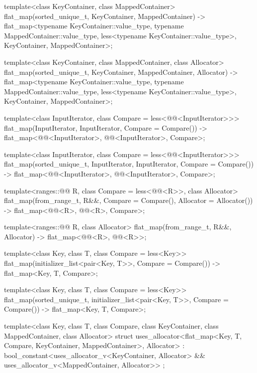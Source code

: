 \begin{codeblock}
{  template<class KeyContainer, class MappedContainer>
    flat_map(sorted_unique_t, KeyContainer, MappedContainer)
      -> flat_map<typename KeyContainer::value_type, typename MappedContainer::value_type,
                  less<typename KeyContainer::value_type>, KeyContainer, MappedContainer>;

  template<class KeyContainer, class MappedContainer, class Allocator>
    flat_map(sorted_unique_t, KeyContainer, MappedContainer, Allocator)
      -> flat_map<typename KeyContainer::value_type, typename MappedContainer::value_type,
                  less<typename KeyContainer::value_type>, KeyContainer, MappedContainer>;

  template<class InputIterator, class Compare = less<@@<InputIterator>>>
    flat_map(InputIterator, InputIterator, Compare = Compare())
      -> flat_map<@@<InputIterator>, @@<InputIterator>, Compare>;

  template<class InputIterator, class Compare = less<@@<InputIterator>>>
    flat_map(sorted_unique_t, InputIterator, InputIterator, Compare = Compare())
      -> flat_map<@@<InputIterator>, @@<InputIterator>, Compare>;

  template<ranges::@@ R, class Compare = less<@@<R>>,
           class Allocator>
    flat_map(from_range_t, R&&, Compare = Compare(), Allocator = Allocator())
      -> flat_map<@@<R>, @@<R>, Compare>;

  template<ranges::@@ R, class Allocator>
    flat_map(from_range_t, R&&, Allocator)
      -> flat_map<@@<R>, @@<R>>;

  template<class Key, class T, class Compare = less<Key>>
    flat_map(initializer_list<pair<Key, T>>, Compare = Compare())
      -> flat_map<Key, T, Compare>;

  template<class Key, class T, class Compare = less<Key>>
    flat_map(sorted_unique_t, initializer_list<pair<Key, T>>, Compare = Compare())
        -> flat_map<Key, T, Compare>;

  template<class Key, class T, class Compare, class KeyContainer, class MappedContainer,
            class Allocator>
    struct uses_allocator<flat_map<Key, T, Compare, KeyContainer, MappedContainer>, Allocator>
      : bool_constant<uses_allocator_v<KeyContainer, Allocator> &&
                      uses_allocator_v<MappedContainer, Allocator>> { };
}
\end{codeblock}

